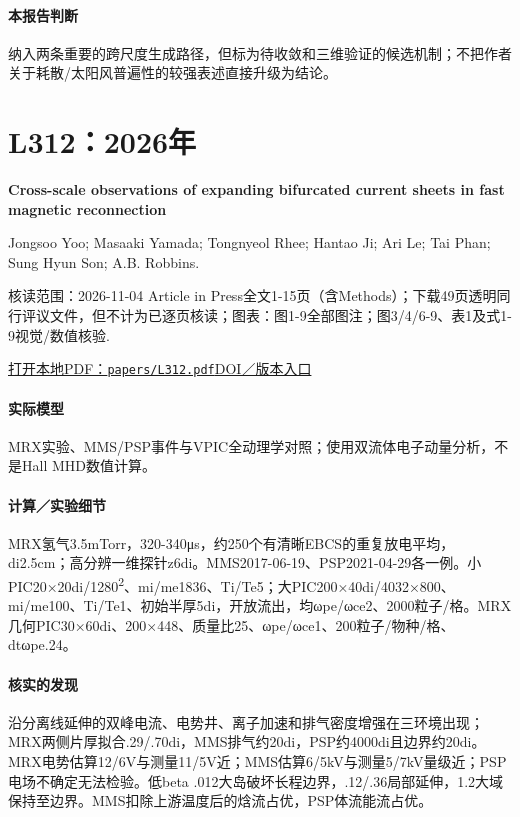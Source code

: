 \paragraph{本报告判断}纳入两条重要的跨尺度生成路径，但标为待收敛和三维验证的候选机制；不把作者关于耗散/太阳风普遍性的较强表述直接升级为结论。

\section{L312：2026年}\label{paper:L312}

\textbf{Cross-scale observations of expanding bifurcated current sheets in fast magnetic reconnection}\citep{L312}\

Jongsoo Yoo;  Masaaki Yamada;  Tongnyeol Rhee;  Hantao Ji;  Ari Le;  Tai Phan;  Sung Hyun Son;  A.B. Robbins.

\textsf{核读范围：}2026-11-04 Article in Press全文1-15页（含Methods）；下载49页透明同行评议文件，但不计为已逐页核读；\textsf{图表：}图1-9全部图注；图3/4/6-9、表1及式1-9视觉/数值核验.

\href{run:papers/L312.pdf}{打开本地PDF：\texttt{papers/L312.pdf}}\quad\href{https://doi.org/10.1038/s41467-026-79220-2}{DOI／版本入口}

\paragraph{实际模型}MRX实验、MMS/PSP事件与VPIC全动理学对照；使用双流体电子动量分析，不是Hall MHD数值计算。

\paragraph{计算／实验细节}MRX氢气3.5mTorr，320-340μs，约250个有清晰EBCS的重复放电平均，di2.5cm；高分辨一维探针z6di。MMS2017-06-19、PSP2021-04-29各一例。小PIC20×20di/1280\textsuperscript{2}、mi/me1836、Ti/Te5；大PIC200×40di/4032×800、mi/me100、Ti/Te1、初始半厚5di，开放流出，均ωpe/ωce2、2000粒子/格。MRX几何PIC30×60di、200×448、质量比25、ωpe/ωce1、200粒子/物种/格、dtωpe.24。

\paragraph{核实的发现}沿分离线延伸的双峰电流、电势井、离子加速和排气密度增强在三环境出现；MRX两侧片厚拟合.29/.70di，MMS排气约20di，PSP约4000di且边界约20di。MRX电势估算12/6V与测量11/5V近；MMS估算6/5kV与测量5/7kV量级近；PSP电场不确定无法检验。低beta .012大岛破坏长程边界，.12/.36局部延伸，1.2大域保持至边界。MMS扣除上游温度后的焓流占优，PSP体流能流占优。

